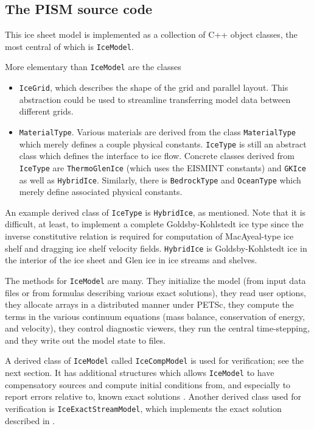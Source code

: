 \documentclass[12pt,final]{amsart}
\renewcommand{\t}[1]{\texttt{#1}}
\begin{document}
\subsection{The PISM source code} This ice sheet model is implemented as a collection of C++ object classes, the most central of which is \t{IceModel}.

More elementary than \t{IceModel} are the classes\begin{itemize}
\item \t{IceGrid}, which describes the shape of the grid and parallel
layout. This abstraction could be used to streamline transferring model data between
different grids.
\item \t{MaterialType}.  Various materials are derived from the class \t{MaterialType} which merely defines a couple
physical constants. \t{IceType} is still an abstract class which defines the interface to
ice flow. Concrete classes derived from \t{IceType} are \t{ThermoGlenIce} (which uses the
EISMINT constants) and \t{GKIce} as well as \t{HybridIce}.  Similarly, there is \t{BedrockType} and \t{OceanType} which merely define
associated physical constants.\end{itemize}

An example derived class of \t{IceType} is \t{HybridIce}, as mentioned.  Note that it is difficult, at least, to implement a complete Goldsby-Kohlstedt ice type \cite{GoldsbyKohlstedt} since the inverse constitutive
relation is required for computation of MacAyeal-type ice shelf and dragging ice shelf \cite{MacAyeal} velocity fields. \t{HybridIce} is Goldsby-Kohlstedt ice in the interior of the ice sheet and Glen ice in ice streams and
shelves.

The methods for \t{IceModel} are many.  They initialize the model (from input data files or from formulas describing various exact solutions), they read user options, they allocate arrays in a distributed manner under PETSc, they compute the terms in the various continuum equations (mass balance, conservation of energy, and velocity), they control diagnostic viewers, they run the central time-stepping, and they write out the model state to files.

A derived class of \t{IceModel} called \t{IceCompModel} is used for verification; see the next section.  It has additional structures which allows \t{IceModel} to have compensatory sources and compute initial conditions from, and especially to report errors relative to, known exact solutions \cite{BLKCB,BBL,BB}.  Another derived class used for verification is \t{IceExactStreamModel}, which implements the exact solution described in \cite{SchoofStream}.
\end{document}
